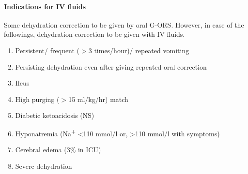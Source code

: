 \documentclass[11pt,a4paper]{report}
\begin{document}
\paragraph{Indications for IV fluids}
Some dehydration correction to be given by oral G-ORS. However, in case of the followings, dehydration correction to be given with IV fluids. 
\begin{enumerate}
	\item Persistent/ frequent ($>$3 times/hour)/ repeated vomiting 
	\item Persisting dehydration even after giving repeated oral correction 
	\item Ileus 
	\item High purging ($>$15 ml/kg/hr) match 
	\item Diabetic ketoacidosis (NS)
	\item Hyponatremia (Na\textsuperscript{+} \textless 110 mmol/l or, \textgreater 110 mmol/l with symptoms)
	\item Cerebral edema (3\%  in ICU)
	\item Severe dehydration 
\end{enumerate}
\end{document}
